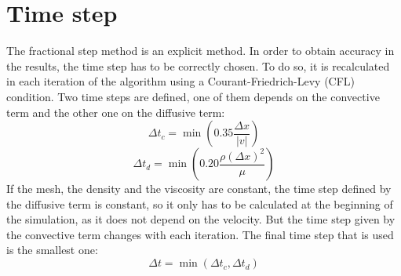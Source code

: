 \section{Time step}
The fractional step method is an explicit method. In order to obtain accuracy in the results, the time step has to be correctly chosen. To do so, it is recalculated in each iteration of the algorithm using a Courant-Friedrich-Levy (CFL) condition. Two time steps are defined, one of them depends on the convective term and the other one on the diffusive term:
\begin{equation}
\Delta t_{c}=\min\left(0.35\frac{\Delta x}{|v|}\right)
\end{equation}
\begin{equation}
\Delta t_{d}=\min\left(0.20\frac{\rho\left(\Delta x\right)^{2}}{\mu}\right)
\end{equation}
If the mesh, the density and the viscosity are constant, the time step defined by the diffusive term is constant, so it only has to be calculated at the beginning of the simulation, as it does not depend on the velocity. But the time step given by the convective term changes with each iteration. The final time step that is used is the smallest one:
\begin{equation}
\Delta t=\min\left(\Delta t_{c}, \Delta t_{d}\right)
\end{equation}